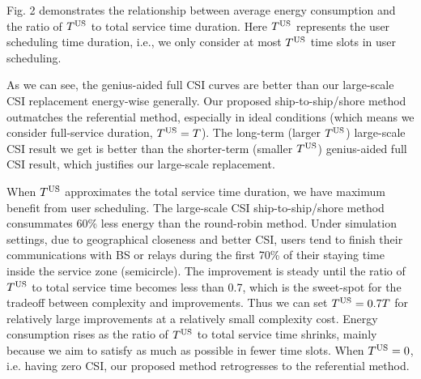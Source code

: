 \documentclass[journal]{IEEEtran}
\begin{document}
 
 Fig. 2 demonstrates the relationship between average energy consumption and the ratio of ${T^{\rm{US}}}$ to total service time duration. Here ${T^{\rm{US}}}$ represents the user scheduling time duration, i.e., we only consider at most $T^{\rm{US}}$ time slots in user scheduling. 
 
 As we can see, the genius-aided full CSI curves are better than our large-scale CSI replacement energy-wise generally. Our proposed ship-to-ship/shore method outmatches the referential method, especially in ideal conditions (which means we consider full-service duration, ${T^{\rm{US}}}=T$). 
 The long-term (larger $T^{\rm{US}}$) large-scale CSI result we get is better than the shorter-term (smaller $T^{\rm{US}}$) genius-aided full CSI result, which justifies our large-scale replacement. 
 
 When ${T^{\rm{US}}}$ approximates the total service time duration, we have maximum benefit from user scheduling. The large-scale CSI ship-to-ship/shore method consummates 60\% less energy than the round-robin method. 
 Under simulation settings, due to geographical closeness and better CSI, users tend to finish their communications with BS or relays during the first 70\% of their staying time inside the service zone (semicircle). The improvement is steady until the ratio of ${T^{\rm{US}}}$ to total service time becomes less than 0.7, which is the sweet-spot for the tradeoff between complexity and improvements. Thus we can set ${T^{\rm{US}}=0.7T}$ for relatively large improvements at a relatively small complexity cost. 
 Energy consumption rises as the ratio of ${T^{\rm{US}}}$ to total service time shrinks, mainly because we aim to satisfy as much as possible in fewer time slots. When ${T^{\rm{US}}} = 0$, i.e. having zero CSI, our proposed method retrogresses to the referential method. 
 
 
 
\end{document}
